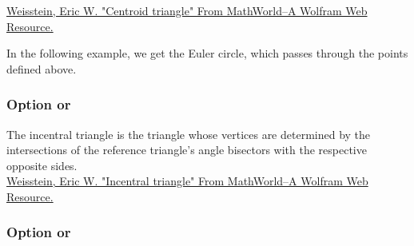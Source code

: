 \href{http://mathworld.wolfram.com/TriangleCentroid.html}{Weisstein, Eric W. "Centroid triangle" From MathWorld--A Wolfram Web Resource.}

In the following example, we get the Euler circle, which passes through the points defined above.

\begin{tkzexample}[latex=7cm,small]
\end{tkzexample}

\subsubsection{Option  or  }

The incentral triangle is the triangle whose vertices are determined by
the intersections of the reference triangle’s angle bisectors with the
respective opposite sides.
\\
\href{http://mathworld.wolfram.com/ContactTriangle.html}{Weisstein, Eric W. "Incentral triangle" From MathWorld--A Wolfram Web Resource.}


\begin{tkzexample}[latex=7cm,small]
\end{tkzexample}

\subsubsection{Option  or  }

